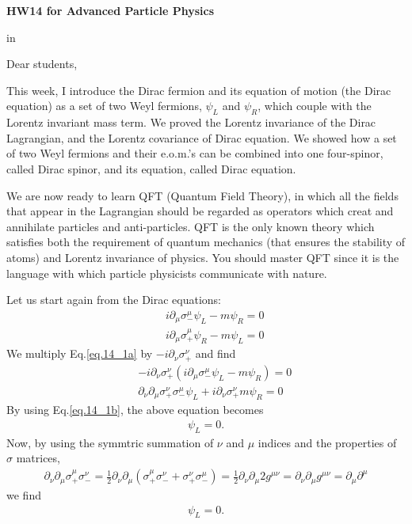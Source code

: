 \documentclass[12pt]{article}
\def\del{{\partial}}
\begin{document}
\begin{center}
{\large\bf HW14 for Advanced Particle Physics} \\

\end{center}

 in

Dear students,

  This week, I introduce the Dirac fermion and its equation of motion
  (the Dirac equation) as a set of two Weyl fermions, $\psi_L$ and $\psi_R$,
  which couple with the Lorentz invariant mass term.  We proved the
  Lorentz invariance of the Dirac Lagrangian, and the Lorentz covariance
  of Dirac equation.  We showed how a set of two Weyl fermions and their
  e.o.m.'s can be combined into one four-spinor, called Dirac spinor,
  and its equation, called Dirac equation.

  We are now ready to learn QFT (Quantum Field Theory), in which all
  the fields that appear in the Lagrangian should be regarded as
  operators which creat and annihilate particles and anti-particles.
  QFT is the only known theory which satisfies both the requirement
  of quantum mechanics (that ensures the stability of atoms) and
  Lorentz invariance of physics. You should master QFT since it is
  the language with which particle physicists communicate with nature.


  Let us start again from the Dirac equations:
\begin{eqnarray}
 && i\del_\mu \sigma_-^\mu \psi_L - m \psi_R = 0 \label{eq.14_1a} \\
 && i\del_\mu \sigma_+^\mu \psi_R - m \psi_L = 0 \label{eq.14_1b} 
\end{eqnarray}
  We multiply Eq.\ref{eq.14_1a} by $-i\del_\nu \sigma_+^\nu$ and find
\begin{eqnarray}
  && -i\del_\nu \sigma_+^\nu
  (i\del_\mu \sigma_-^\mu \psi_L - m \psi_R) = 0 \label{eq.14_2a} \\
  && \del_\nu \del_\mu \sigma_+^\nu \sigma_-^\mu \psi_L
  +i\del_\nu \sigma_+^\nu m \psi_R = 0 \label{eq.14_3a}
\end{eqnarray}
  By using Eq.\ref{eq.14_1b}, the above equation becomes
\begin{eqnarray}
  [\del_\nu \del_\mu \sigma_+^\nu \sigma_-^\mu + m^2] \psi_L = 0. \label{eq.14_4a}
\end{eqnarray}
  Now, by using the symmtric summation of $\nu$ and $\mu$ indices and the
  properties of $\sigma$ matrices,
\begin{eqnarray}
  \del_\nu \del_\mu \sigma_+^\mu \sigma_-^\nu
  = \frac{1}{2} \del_\nu \del_\mu
    (\sigma_+^\mu \sigma_-^\nu + \sigma_+^\nu \sigma_-^\mu)
  = \frac{1}{2} \del_\nu \del_\mu { 2 g^{\mu\nu} }
  = \del_\nu \del_\mu g^{\mu\nu}
  = \del_\mu \del^\mu \label{eq.14_5a}
\end{eqnarray}
  we find
\begin{eqnarray}
  [ \del_\mu \del^\mu + m^2 ] \psi_L = 0. \label{eq.14_6a}
\end{eqnarray}
\end{document}
